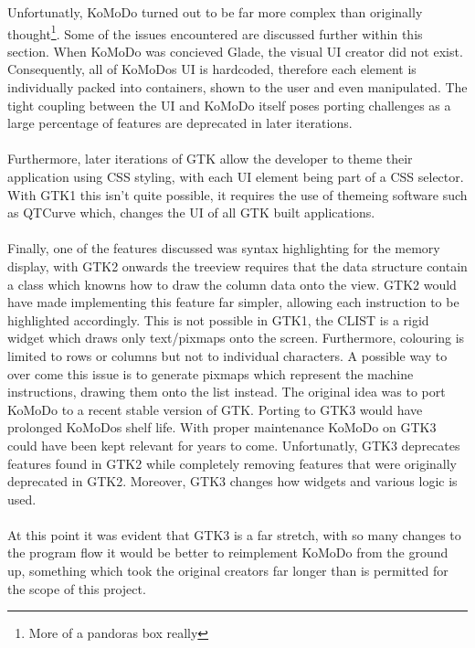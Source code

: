   Unfortunatly, KoMoDo turned out to be far more complex than originally thought\footnote{More of a pandoras box really}. Some of the issues encountered are discussed further within this section.
    When KoMoDo was concieved Glade, the visual UI creator did not exist. Consequently, all of KoMoDos UI is hardcoded, therefore each element is individually packed into containers, shown to the user and even manipulated. The tight coupling between the UI and KoMoDo itself poses porting challenges as a large percentage of features are deprecated in later iterations.\\\\
    Furthermore, later iterations of GTK allow the developer to theme their application using CSS styling, with each UI element being part of a CSS selector. With GTK1 this isn't quite possible, it requires the use of themeing software such as QTCurve which, changes the UI of all GTK built applications.\\\\
    Finally, one of the features discussed was syntax highlighting for the memory display, with GTK2 onwards the treeview requires that the data structure contain a class which knowns how to draw the column data onto the view. GTK2 would have made implementing this feature far simpler, allowing each instruction to be highlighted accordingly. This is not possible in GTK1, the CLIST is a rigid widget which draws only text/pixmaps onto the screen. Furthermore, colouring is limited to rows or columns but not to individual characters. A possible way to over come this issue is to generate pixmaps which represent the machine instructions, drawing them onto the list instead.
    The original idea was to port KoMoDo to a recent stable version of GTK. Porting to GTK3 would have prolonged KoMoDos shelf life. With proper maintenance KoMoDo on GTK3 could have been kept relevant for years to come. Unfortunatly, GTK3 deprecates features found in GTK2 while completely removing features that were originally deprecated in GTK2. Moreover, GTK3 changes how widgets and various logic is used.\\\\
    At this point it was evident that GTK3 is a far stretch, with so many changes to the program flow it would be better to reimplement KoMoDo from the ground up, something which took the original creators far longer than is permitted for the scope of this project.
